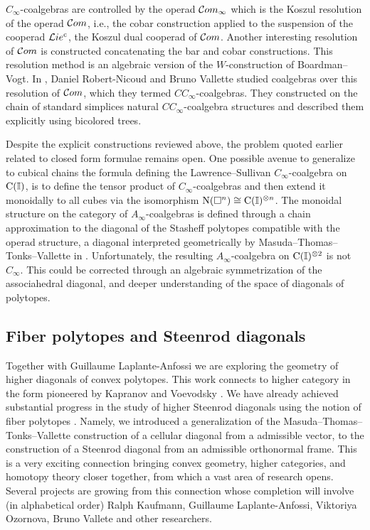 $C_\infty$-coalgebras are controlled by the operad $\mathcal{C}om_\infty$ which is the Koszul resolution of the operad $\mathcal{C}om$, i.e., the cobar construction applied to the suspension of the cooperad $\mathcal{L}ie^{\mathrm c}$, the Koszul dual cooperad of $\mathcal{C}om$.
Another interesting resolution of $\mathcal{C}om$ is constructed concatenating the bar and cobar constructions.
This resolution method is an algebraic version of the $W$-construction of Boardman--Vogt.
In \cite{vallette2020higherlietheory}, Daniel Robert-Nicoud and Bruno Vallette studied coalgebras over this resolution of $\mathcal{C}om$, which they termed $CC_\infty$-coalgebras.
They constructed on the chain of standard simplices natural $CC_\infty$-coalgebra structures and described them explicitly using bicolored trees.

Despite the explicit constructions reviewed above, the problem quoted earlier related to closed form formulae remains open.
One possible avenue to generalize to cubical chains the formula defining the Lawrence--Sullivan $C_\infty$-coalgebra on $\operatorname{C}(\mathbb{I})$, is to define the tensor product of $C_\infty$-coalgebras and then extend it monoidally to all cubes via the isomorphism $\operatorname{N}(\square^n) \cong \operatorname{C}(\mathbb{I})^{\otimes n}$.
The monoidal structure on the category of $A_\infty$-coalgebras is defined through a chain approximation to the diagonal of the Stasheff polytopes compatible with the operad structure, a diagonal interpreted geometrically by Masuda--Thomas--Tonks--Vallette in \cite{vallette2021associahedra}.
Unfortunately, the resulting $A_\infty$-coalgebra on $\operatorname{C}(\mathbb{I})^{\otimes 2}$ is not $C_\infty$.
This could be corrected through an algebraic symmetrization of the associahedral diagonal, and deeper understanding of the space of diagonals of polytopes.

\subsection{Fiber polytopes and Steenrod diagonals} \label{ss:polytopes}

Together with Guillaume Laplante-Anfossi we are exploring the geometry of higher diagonals of convex polytopes.
This work connects to higher category in the form pioneered by Kapranov and Voevodsky \cite{kapranov1991polycategories}.
We have already achieved substantial progress in the study of higher Steenrod diagonals using the notion of fiber polytopes \cite{billera1992fiber.polytopes}.
Namely, we introduced a generalization of the Masuda--Thomas--Tonks--Vallette construction of a cellular diagonal from a admissible vector, to the construction of a Steenrod diagonal from an admissible orthonormal frame.
This is a very exciting connection bringing convex geometry, higher categories, and homotopy theory closer together, from which a vast area of research opens.
Several projects are growing from this connection whose completion will involve (in alphabetical order) Ralph Kaufmann, Guillaume Laplante-Anfossi, Viktoriya Ozornova, Bruno Vallete and other researchers.

